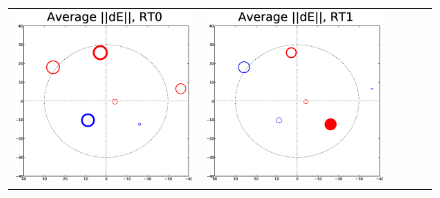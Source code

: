 \documentclass[]{aa}
\begin{document}
\begin{figure}
\centering
\begin{tabular}{@{}c@{}c@{}c@{}c@{}c@{}}
\includegraphics[width=\roguewidth]{o2006_dE_ant0} &
\includegraphics[width=\roguewidth]{o2006_dE_ant1} &

\end{tabular}
\end{figure}
\end{document}
